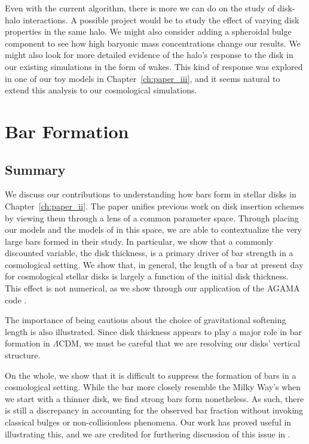 Even with the current algorithm, there is more we can do on the study of disk-halo interactions. A possible project would be to study the effect of varying disk properties in the same halo. We might also consider adding a spheroidal bulge component to see how high baryonic mass concentrations change our results. We might also look for more detailed evidence of the halo's response to the disk in our existing simulations in the form of wakes. This kind of response was explored in one of our toy models in Chapter~\ref{ch:paper_iii}, and it seems natural to extend this analysis to our cosmological simulations.


\section{Bar Formation}
\subsection{Summary}

We discuss our contributions to understanding how bars form in stellar disks in Chapter~\ref{ch:paper_ii}. The paper unifies previous work on disk insertion schemes by viewing them through a lens of a common parameter space. Through placing our models and the models of \citet{YurinSpringelStellarDisks} in this space, we are able to contextualize the very large bars formed in their study. In particular, we show that a commonly discounted variable, the disk thickness, is a primary driver of bar strength in a cosmological setting. We show that, in general, the length of a bar at present day for cosmological stellar disks is largely a function of the initial disk thickness. This effect is not numerical, as we show through our application of the \textsc{AGAMA} code \citep{vasiliev_2018}. 

The importance of being cautious about the choice of gravitational softening length is also illustrated. Since disk thickness appears to play a major role in bar formation in $\Lambda$CDM, we must be careful that we are resolving our disks' vertical structure.


On the whole, we show that it is difficult to suppress the formation of bars in a cosmological setting. While the bar more closely resemble the Milky Way's when we start with a thinner disk, we find strong bars form nonetheless. As such, there is still a discrepancy in accounting for the observed bar fraction without invoking classical bulges or non-collisionless phenomena. Our work has proved useful in illustrating this, and we are credited for furthering discussion of this issue in \citet{sellwood_2019}.


